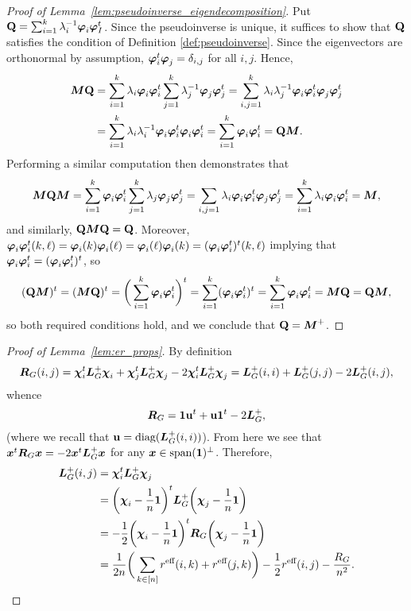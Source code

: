 \begin{proof}[Proof of Lemma~\ref{lem:pseudoinverse_eigendecomposition}]
	Put $\vb{Q}=\sum_{i=1}^k \lambda_i^{-1}\vb*{\varphi}_i\vb*{\varphi}_I^t$. Since the pseudoinverse is unique, it suffices to show that $\vb{Q}$ satisfies the condition of Definition \ref{def:pseudoinverse}.
	Since the eigenvectors are orthonormal by assumption, $\vb*{\varphi}_i^t\vb*{\varphi}_j=\delta_{i,j}$ for all $i,j$. Hence,  
	\begin{align*}
	{\vb*{M}}\vb{Q}&= \sum_{i=1}^k \lambda_i\vb*{\varphi}_i\vb*{\varphi}_i^t \sum_{j=1}^k \lambda_j^{-1}\vb*{\varphi}_j\vb*{\varphi}_j^t = \sum_{i,j=1}^k \lambda_i\lambda_j^{-1} \vb*{\varphi}_i\vb*{\varphi}_i^t \vb*{\varphi}_j\vb*{\varphi}_j^t \\
	&= \sum_{i=1}^k \lambda_i\lambda_i^{-1} \vb*{\varphi}_i\vb*{\varphi}_i^t\vb*{\varphi}_i\vb*{\varphi}_i^t 
	= \sum_{i=1}^k \vb*{\varphi}_i\vb*{\varphi}_i^t = \vb{Q}{\vb*{M}}.
	\end{align*}
	Performing a similar computation then demonstrates that 
	\[{\vb*{M}}\vb{Q}{\vb*{M}} = \sum_{i=1}^k \vb*{\varphi}_i\vb*{\varphi}_i^t \sum_{j=1}^k \lambda_j\vb*{\varphi}_j\vb*{\varphi}_j^t=\sum_{i,j=1}\lambda_i \vb*{\varphi}_i\vb*{\varphi}_i^t\vb*{\varphi}_j\vb*{\varphi}_j^t=\sum_{i=1}^k \lambda_i \vb*{\varphi}_i\vb*{\varphi}_i^t ={\vb*{M}},\]
	and similarly, $\vb{Q}{\vb*{M}}\vb{Q}=\vb{Q}$. Moreover, $\vb*{\varphi}_i\vb*{\varphi}_i^t (k,\ell)=\vb*{\varphi}_i(k)\vb*{\varphi}_i(\ell)=\vb*{\varphi}_i(\ell)\vb*{\varphi}_i(k)=(\vb*{\varphi}_i\vb*{\varphi}_i^t)^t (k,\ell)$ implying that $\vb*{\varphi}_i\vb*{\varphi}_i^t=(\vb*{\varphi}_i\vb*{\varphi}_i^t)^t$, so 
	\[(\vb{Q}{\vb*{M}})^t=({\vb*{M}}\vb{Q})^t =\bigg(\sum_{i=1}^k \vb*{\varphi}_i\vb*{\varphi}_i^t \bigg)^t = \sum_{i=1}^k (\vb*{\varphi}_i\vb*{\varphi}_i^t)^t = \sum_{i=1}^k \vb*{\varphi}_i\vb*{\varphi}_i^t={\vb*{M}}\vb{Q}=\vb{Q}{\vb*{M}},\]
	so both required conditions hold, and we conclude that $\vb{Q}={\vb*{M}}^+$. 
\end{proof}

\begin{proof}[Proof of Lemma~\ref{lem:er_props}]
	By definition 
	\begin{equation*}
	\vb*{R}_G(i,j) = \boldsymbol{\chi}_i^t\vb*{L}_G^+\boldsymbol{\chi}_i + \boldsymbol{\chi}_j^t \vb*{L}_G^+\boldsymbol{\chi}_j -2 \boldsymbol{\chi}_i^t \vb*{L}_G^+\boldsymbol{\chi}_j = \vb*{L}_G^+(i,i) + \vb*{L}_G^+(j,j) - 2\vb*{L}_G^+(i,j),
	\end{equation*}
	whence
	\begin{equation*}
	\vb*{R}_G = \vb{1} \vb{u} ^t + \vb{u}\vb{1}^t - 2\vb*{L}_G^+,
	\end{equation*}
	(where we recall that  $\vb{u}=\text{diag}(\vb*{L}_G^+(i,i))$).  From here we  see that $\vb*{x}^t \vb*{R}_G\vb*{x} = -2\vb*{x}^t \vb*{L}_G^+\vb*{x}$ for any $\vb*{x}\in\textnormal{span}(\vb{1})^\perp$. Therefore, 
	\begin{align}
	\vb*{L}_G^+(i,j)&=\boldsymbol{\chi}_i^t \vb*{L}_G^+\boldsymbol{\chi}_j \notag \\
	&= \bigg(\boldsymbol{\chi}_i-\frac{1}{n}\vb{1}\bigg)^t \vb*{L}_G^+\bigg(\boldsymbol{\chi}_j-\frac{1}{n}\vb{1}\bigg) \notag \\
	&= -\frac{1}{2}\bigg(\boldsymbol{\chi}_i-\frac{1}{n}\vb{1}\bigg)^t \vb*{R}_G\bigg(\boldsymbol{\chi}_j-\frac{1}{n}\vb{1}\bigg) \notag \\
	&= \frac{1}{2n}\bigg(\sum_{k\in[n]}r^{\text{eff}}(i,k)+r^{\text{eff}}(j,k)\bigg) - \frac{1}{2}r^{\text{eff}}(i,j) -\frac{R_G}{n^2}.\notag\qedhere 
	\end{align}
\end{proof}

